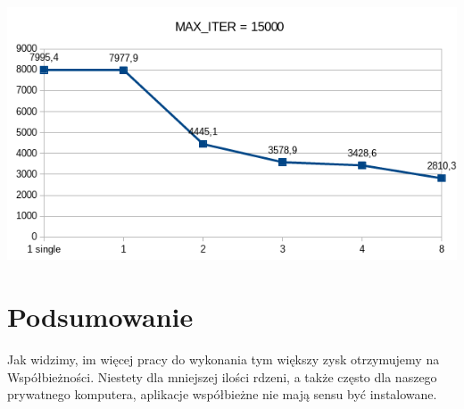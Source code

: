 \documentclass[a4paper,10pt]{article}
\begin{document}
\includegraphics[width=\textwidth]{3.png}
\vspace*{10mm}\\
\section*{Podsumowanie}
Jak widzimy, im więcej pracy do wykonania tym większy zysk otrzymujemy na Współbieżności. Niestety dla mniejszej ilości rdzeni, a także często dla naszego prywatnego komputera, aplikacje współbieżne nie mają sensu być instalowane.
\end{document}
